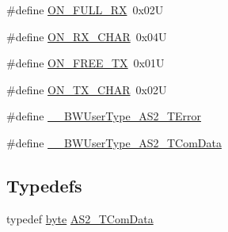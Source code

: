 \begin{DoxyCompactItemize}
\#define \hyperlink{group___a_s2__module_ga2cf6b6a2b8c83f7d1d7e6134c6bd9a4a}{O\+N\+\_\+\+F\+U\+L\+L\+\_\+\+RX}~0x02U
\item 
\#define \hyperlink{group___a_s2__module_gad07f43952e300ba1e45521ce777c09d4}{O\+N\+\_\+\+R\+X\+\_\+\+C\+H\+AR}~0x04U
\item 
\#define \hyperlink{group___a_s2__module_ga71d35387335972e4f6ae07ecccf27724}{O\+N\+\_\+\+F\+R\+E\+E\+\_\+\+TX}~0x01U
\item 
\#define \hyperlink{group___a_s2__module_gaf02aa8bfc7e9b5338168db9ff9077c0d}{O\+N\+\_\+\+T\+X\+\_\+\+C\+H\+AR}~0x02U
\item 
\#define \hyperlink{group___a_s2__module_ga3940e37533c2eaf8a4c6e8b18ae63f83}{\+\_\+\+\_\+\+B\+W\+User\+Type\+\_\+\+A\+S2\+\_\+\+T\+Error}
\item 
\#define \hyperlink{group___a_s2__module_ga22728c9792ecf6c833313674b37c5553}{\+\_\+\+\_\+\+B\+W\+User\+Type\+\_\+\+A\+S2\+\_\+\+T\+Com\+Data}
\end{DoxyCompactItemize}
\subsection*{Typedefs}
\begin{DoxyCompactItemize}
\item 
typedef \hyperlink{group___p_e___types__module_ga0c8186d9b9b7880309c27230bbb5e69d}{byte} \hyperlink{group___a_s2__module_ga170d994b72d9b50b90572e909959cbf1}{A\+S2\+\_\+\+T\+Com\+Data}
\end{DoxyCompactItemize}
